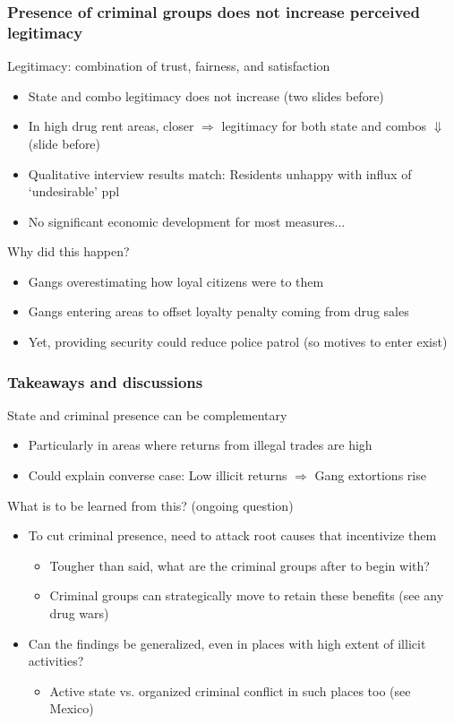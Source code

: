\documentclass[aspectratio=169]{beamer}
\begin{document}
\begin{frame}
\frametitle{Presence of criminal groups does not increase perceived legitimacy} 
Legitimacy: combination of trust, fairness, and satisfaction
\begin{itemize}\setlength\itemsep{3pt}
\item State and combo legitimacy does not increase (two slides before)
\item In high drug rent areas, closer $\Rightarrow$ legitimacy for both state and combos $\Downarrow$ (slide before)
\item Qualitative interview results match: Residents unhappy with influx of `undesirable' ppl
\item No significant economic development for most measures...
\end{itemize}\medskip
Why did this happen?
\begin{itemize}\setlength\itemsep{3pt}
\item Gangs overestimating how loyal citizens were to them
\item Gangs entering areas to offset loyalty penalty coming from drug sales
\item Yet, providing security could reduce police patrol (so motives to enter exist)
\end{itemize}\medskip
\end{frame}

\begin{frame}
\frametitle{Takeaways and discussions} 
State and criminal presence can be complementary
\begin{itemize}\setlength\itemsep{3pt}
  \item Particularly in areas where returns from illegal trades are high
  \item Could explain converse case: Low illicit returns $\Rightarrow$ Gang extortions rise
\end{itemize}\medskip
What is to be learned from this? (ongoing question)
\begin{itemize}\setlength\itemsep{3pt}
\item To cut criminal presence, need to attack root causes that incentivize them
\begin{itemize}\setlength\itemsep{3pt}
\item Tougher than said, what are the criminal groups after to begin with?
\item Criminal groups can strategically move to retain these benefits (see any drug wars)
\end{itemize}
  \item Can the findings be generalized, even in places with high extent of illicit activities?
 \begin{itemize}
\item Active state vs. organized criminal conflict in such places too (see Mexico)
\end{itemize}
\end{itemize}\medskip
\end{frame}
\end{document}
